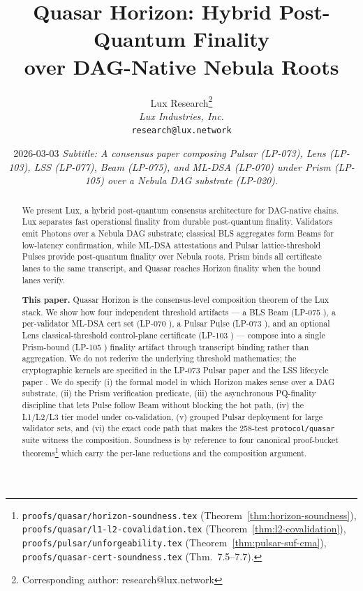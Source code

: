 \documentclass[11pt,a4paper]{article}
\title{Quasar Horizon: Hybrid Post-Quantum Finality\\over DAG-Native Nebula Roots}
\author{
Lux Research\thanks{Corresponding author: research@lux.network}\\
\textit{Lux Industries, Inc.}\\
\texttt{research@lux.network}
}
\date{2026-03-03 \quad\textit{Subtitle: A consensus paper composing Pulsar (LP-073), Lens (LP-103), LSS (LP-077), Beam (LP-075), and ML-DSA (LP-070) under Prism (LP-105) over a Nebula DAG substrate (LP-020).}}
\begin{document}
\luxcoverpage

\begin{abstract}
\noindent We present Lux, a hybrid post-quantum consensus architecture for DAG-native chains. Lux separates fast operational finality from durable post-quantum finality. Validators emit Photons over a Nebula DAG substrate; classical BLS aggregates form Beams for low-latency confirmation, while ML-DSA attestations and Pulsar lattice-threshold Pulses provide post-quantum finality over Nebula roots. Prism binds all certificate lanes to the same transcript, and Quasar reaches Horizon finality when the bound lanes verify.

\textbf{This paper.} Quasar Horizon is the consensus-level composition theorem of the Lux stack. We show how four independent threshold artifacts --- a BLS Beam (LP-075 \cite{lp075}), a per-validator ML-DSA cert set (LP-070 \cite{lp070}), a Pulsar Pulse (LP-073 \cite{lp073}), and an optional Lens classical-threshold control-plane certificate (LP-103 \cite{lp103}) --- compose into a single Prism-bound (LP-105 \cite{lp105}) finality artifact through transcript binding rather than aggregation. We do not rederive the underlying threshold mathematics; the cryptographic kernels are specified in the LP-073 Pulsar paper \cite{lp073} and the LSS lifecycle paper \cite{luxlssmpc,lp077}. We do specify (i) the formal model in which Horizon makes sense over a DAG substrate, (ii) the Prism verification predicate, (iii) the asynchronous PQ-finality discipline that lets Pulse follow Beam without blocking the hot path, (iv) the L1/L2/L3 tier model under co-validation, (v) grouped Pulsar deployment for large validator sets, and (vi) the exact code path that makes the 258-test \texttt{protocol/quasar} suite witness the composition. Soundness is by reference to four canonical proof-bucket theorems\footnote{\texttt{proofs/quasar/horizon-soundness.tex} (Theorem~\ref{thm:horizon-soundness}), \texttt{proofs/quasar/l1-l2-covalidation.tex} (Theorem~\ref{thm:l2-covalidation}), \texttt{proofs/pulsar/unforgeability.tex} (Theorem~\ref{thm:pulsar-suf-cma}), \texttt{proofs/quasar-cert-soundness.tex} (Thm.~7.5--7.7).} which carry the per-lane reductions and the composition argument.
\end{abstract}

\tableofcontents
\newpage














\end{document}
